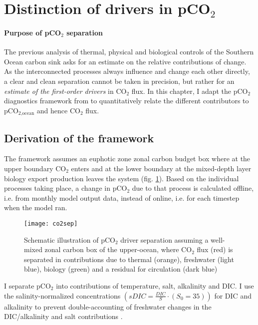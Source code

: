 \documentclass[12pt]{article}
\begin{document}
\clearpage
\section{Distinction of drivers in pCO$_2$}
\label{ch:pCO2separation}

\paragraph{Purpose of pCO$_2$ separation}
The previous analysis of thermal, physical and biological controls of the Southern Ocean carbon sink asks for an estimate on the relative contributions of change. As the interconnected processes always influence and change each other directly, a clear and clean separation cannot be taken in precision, but rather for an \textit{estimate of the first-order drivers} in CO$_2$ flux. In this chapter, I adapt the pCO$_2$ diagnostics framework from \cite{Lovenduski2007} to quantitatively relate the different contributors to pCO$_{\text{2,ocean}}$ and hence CO$_2$ flux.

\subsection{Derivation of the framework}
The framework assumes an euphotic zone zonal carbon budget box where at the upper boundary CO$_2$ enters and at the lower boundary at the mixed-depth layer biology export production leaves the system (fig. \ref{fig:pCO2_separation}). Based on the individual processes taking place, a change in pCO$_2$ due to that process is calculated offline, i.e. from monthly model output data, instead of online, i.e. for each timestep when the model ran. \newline
\begin{figure}[h!]
	\centering
	\texttt{[image: co2sep]}
	\caption{Schematic illustration of pCO$_2$ driver separation assuming a well-mixed zonal carbon box of the upper-ocean, where CO$_2$ flux (red) is separated in contributions due to thermal (orange), freshwater (light blue), biology (green) and a residual for circulation (dark blue)}	
	\label{fig:pCO2_separation}
\end{figure}

I separate pCO$_2$ into contributions of temperature, salt, alkalinity and DIC. I use the salinity-normalized concentrations $(sDIC=\frac{DIC}{S}\cdot (S_0=35))$ for DIC and alkalinity to prevent double-accounting of freshwater changes in the DIC/alkalinity and salt contributions \citep{Keeling2004}.
\end{document}

